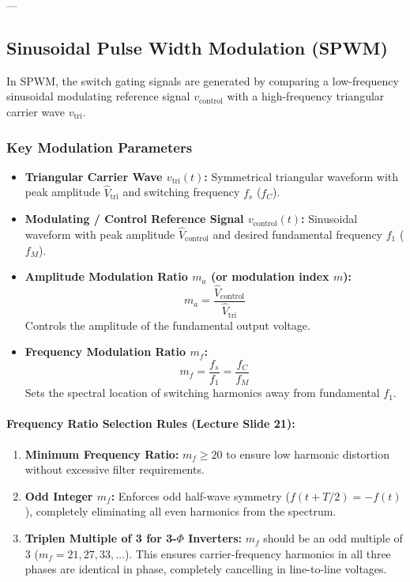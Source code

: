 ---

\subsection{Sinusoidal Pulse Width Modulation (SPWM)}

In SPWM, the switch gating signals are generated by comparing a low-frequency sinusoidal modulating reference signal $v_{\mathrm{control}}$ with a high-frequency triangular carrier wave $v_{\mathrm{tri}}$.

\subsubsection{Key Modulation Parameters}
\begin{itemize}
  \item \textbf{Triangular Carrier Wave $v_{\mathrm{tri}}(t)$:}
  Symmetrical triangular waveform with peak amplitude $\hat{V}_{\mathrm{tri}}$ and switching frequency $f_s$ ($f_C$).
  \item \textbf{Modulating / Control Reference Signal $v_{\mathrm{control}}(t)$:}
  Sinusoidal waveform with peak amplitude $\hat{V}_{\mathrm{control}}$ and desired fundamental frequency $f_1$ ($f_M$).
  \item \textbf{Amplitude Modulation Ratio $m_a$ (or modulation index $m$):}
  \begin{equation}
  m_a = \frac{\hat{V}_{\mathrm{control}}}{\hat{V}_{\mathrm{tri}}}
  \end{equation}
  Controls the amplitude of the fundamental output voltage.
  \item \textbf{Frequency Modulation Ratio $m_f$:}
  \begin{equation}
  m_f = \frac{f_s}{f_1} = \frac{f_C}{f_M}
  \end{equation}
  Sets the spectral location of switching harmonics away from fundamental $f_1$.
\end{itemize}

\paragraph{Frequency Ratio Selection Rules (Lecture Slide 21):}
\begin{enumerate}
  \item \textbf{Minimum Frequency Ratio:} $m_f \ge 20$ to ensure low harmonic distortion without excessive filter requirements.
  \item \textbf{Odd Integer $m_f$:} Enforces odd half-wave symmetry ($f(t + T/2) = -f(t)$), completely eliminating all even harmonics from the spectrum.
  \item \textbf{Triplen Multiple of 3 for 3-$\Phi$ Inverters:} $m_f$ should be an odd multiple of 3 ($m_f = 21, 27, 33, \dots$). This ensures carrier-frequency harmonics in all three phases are identical in phase, completely cancelling in line-to-line voltages.
\end{enumerate}

